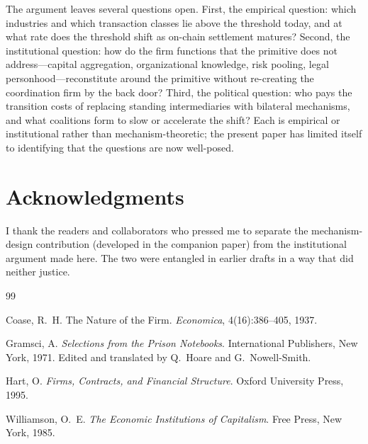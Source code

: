 \documentclass[11pt,a4paper]{article}
\theoremstyle{definition}
\theoremstyle{remark}
\begin{document}
The argument leaves several questions open. First, the empirical
question: which industries and which transaction classes lie above
the threshold today, and at what rate does the threshold shift as
on-chain settlement matures? Second, the institutional question: how
do the firm functions that the primitive does not address---capital
aggregation, organizational knowledge, risk pooling, legal
personhood---reconstitute around the primitive without re-creating
the coordination firm by the back door? Third, the political question:
who pays the transition costs of replacing standing intermediaries
with bilateral mechanisms, and what coalitions form to slow or
accelerate the shift? Each is empirical or institutional rather than
mechanism-theoretic; the present paper has limited itself to
identifying that the questions are now well-posed.

\section*{Acknowledgments}
I thank the readers and collaborators who pressed me to separate the
mechanism-design contribution (developed in the companion paper) from
the institutional argument made here. The two were entangled in
earlier drafts in a way that did neither justice.



\begin{thebibliography}{99}

Coase, R.~H.
\newblock The Nature of the Firm.
\newblock \emph{Economica}, 4(16):386--405, 1937.

Gramsci, A.
\newblock \emph{Selections from the Prison Notebooks}.
\newblock International Publishers, New York, 1971.
\newblock Edited and translated by Q.~Hoare and G.~Nowell-Smith.

Hart, O.
\newblock \emph{Firms, Contracts, and Financial Structure}.
\newblock Oxford University Press, 1995.

Williamson, O.~E.
\newblock \emph{The Economic Institutions of Capitalism}.
\newblock Free Press, New York, 1985.

\end{thebibliography}
\end{document}
